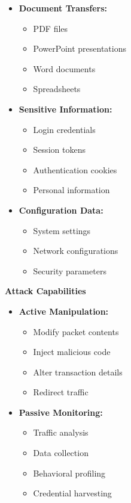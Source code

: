 \begin{itemize}
    \item \textbf{Document Transfers:}
        \begin{itemize}
            \item PDF files
            \item PowerPoint presentations
            \item Word documents
            \item Spreadsheets
        \end{itemize}
    
    \item \textbf{Sensitive Information:}
        \begin{itemize}
            \item Login credentials
            \item Session tokens
            \item Authentication cookies
            \item Personal information
        \end{itemize}
        
    \item \textbf{Configuration Data:}
        \begin{itemize}
            \item System settings
            \item Network configurations
            \item Security parameters
        \end{itemize}
\end{itemize}

\textbf{Attack Capabilities}
\begin{itemize}
    \item \textbf{Active Manipulation:}
        \begin{itemize}
            \item Modify packet contents
            \item Inject malicious code
            \item Alter transaction details
            \item Redirect traffic
        \end{itemize}
    
    \item \textbf{Passive Monitoring:}
        \begin{itemize}
            \item Traffic analysis
            \item Data collection
            \item Behavioral profiling
            \item Credential harvesting
        \end{itemize}
\end{itemize}

